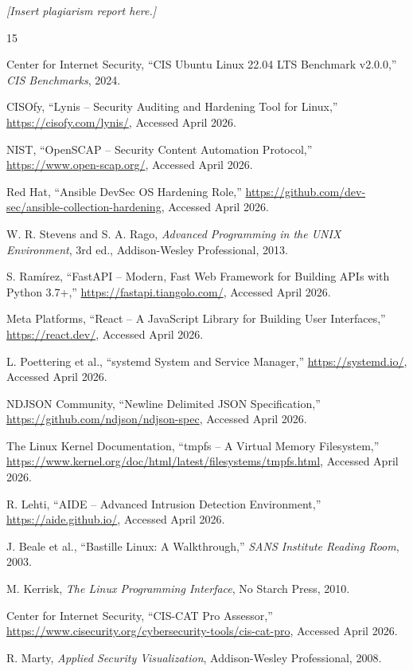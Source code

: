 \textit{[Insert plagiarism report here.]}

\pagebreak
\begin{thebibliography}{15}

Center for Internet Security, ``CIS Ubuntu Linux 22.04 LTS Benchmark v2.0.0,'' \textit{CIS Benchmarks}, 2024.

CISOfy, ``Lynis -- Security Auditing and Hardening Tool for Linux,'' \url{https://cisofy.com/lynis/}, Accessed April 2026.

NIST, ``OpenSCAP -- Security Content Automation Protocol,'' \url{https://www.open-scap.org/}, Accessed April 2026.

Red Hat, ``Ansible DevSec OS Hardening Role,'' \url{https://github.com/dev-sec/ansible-collection-hardening}, Accessed April 2026.

W. R. Stevens and S. A. Rago, \textit{Advanced Programming in the UNIX Environment}, 3rd ed., Addison-Wesley Professional, 2013.

S. Ram\'{i}rez, ``FastAPI -- Modern, Fast Web Framework for Building APIs with Python 3.7+,'' \url{https://fastapi.tiangolo.com/}, Accessed April 2026.

Meta Platforms, ``React -- A JavaScript Library for Building User Interfaces,'' \url{https://react.dev/}, Accessed April 2026.

L. Poettering et al., ``systemd System and Service Manager,'' \url{https://systemd.io/}, Accessed April 2026.

NDJSON Community, ``Newline Delimited JSON Specification,'' \url{https://github.com/ndjson/ndjson-spec}, Accessed April 2026.

The Linux Kernel Documentation, ``tmpfs -- A Virtual Memory Filesystem,'' \url{https://www.kernel.org/doc/html/latest/filesystems/tmpfs.html}, Accessed April 2026.

R. Lehti, ``AIDE -- Advanced Intrusion Detection Environment,'' \url{https://aide.github.io/}, Accessed April 2026.

J. Beale et al., ``Bastille Linux: A Walkthrough,'' \textit{SANS Institute Reading Room}, 2003.

M. Kerrisk, \textit{The Linux Programming Interface}, No Starch Press, 2010.

Center for Internet Security, ``CIS-CAT Pro Assessor,'' \url{https://www.cisecurity.org/cybersecurity-tools/cis-cat-pro}, Accessed April 2026.

R. Marty, \textit{Applied Security Visualization}, Addison-Wesley Professional, 2008.

\end{thebibliography}
